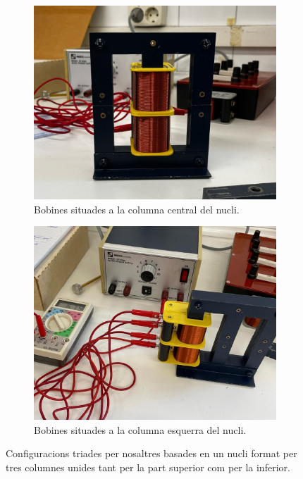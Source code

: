 \documentclass[a4paper,10.5pt]{report}
\begin{document}
\begin{figure}[h]
	\centering
	\begin{subfigure}[b]{0.3\textwidth}
		\centering
		\includegraphics[width=\textwidth]{inv1.jpg}
		\caption{Bobines situades a la columna central del nucli.}
		\label{fig4:3a}
	\end{subfigure}
	\hspace{2cm}
	\begin{subfigure}[b]{0.3\textwidth}
		\centering
		\includegraphics[width=\textwidth]{inv2.jpg}
		\caption{Bobines situades a la columna esquerra del nucli.}
		\label{fig4:3b}
	\end{subfigure}
	\caption{Configuracions triades per nosaltres basades en un nucli format per tres columnes unides tant per la part superior com per la inferior.}
	\label{fig4:3}
\end{figure}
\end{document}

